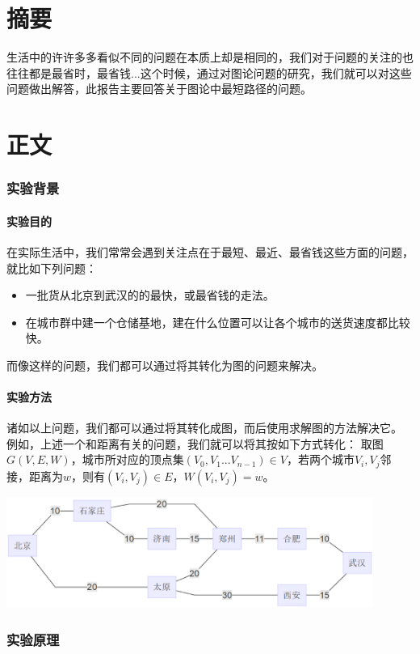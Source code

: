 \documentclass[a4paper,10pt]{ctexart}
\begin{document}
\part*{摘要}
生活中的许许多多看似不同的问题在本质上却是相同的，我们对于问题的关注的也往往都是最省时，最省钱...这个时候，通过对图论问题的研究，我们就可以对这些问题做出解答，此报告主要回答关于图论中最短路径的问题。
\\
\tableofcontents

\newpage
\part{正文}
\section{实验背景}

\subsection{实验目的}
在实际生活中，我们常常会遇到关注点在于最短、最近、最省钱这些方面的问题，就比如下列问题：
\begin{itemize}
\item 一批货从北京到武汉的的最快，或最省钱的走法。
\item 在城市群中建一个仓储基地，建在什么位置可以让各个城市的送货速度都比较快。
\end{itemize}
而像这样的问题，我们都可以通过将其转化为图的问题来解决。

\subsection{实验方法}
诸如以上问题，我们都可以通过将其转化成图，而后使用求解图的方法解决它。
例如，上述一个和距离有关的问题，我们就可以将其按如下方式转化：
取图$G(V,E,W)$，城市所对应的顶点集$(V_0,V_1...V_{n-1}) \in V $，若两个城市$V_i,V_j$邻接，距离为$w$，则有$(V_i,V_j)\in E$，$W(V_i,V_j)=w$。

\includegraphics[width=0.9\textwidth]{MiniLen.eps}

\section{实验原理}
\end{document}
